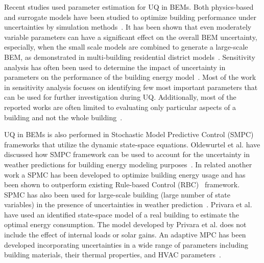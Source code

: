 Recent studies used parameter estimation for UQ in BEMs. Both physics-based and surrogate models have been studied to optimize building performance under uncertainties by simulation methods~\citep{nguyen2014review}. It has been shown that even moderately variable parameters can have a significant effect on the overall BEM uncertainty, especially, when the small scale models are combined to generate a large-scale BEM, as demonstrated in multi-building residential district models~\citep{kavgic2015application,baetens2016modelling}.  Sensitivity analysis has often been used to determine the impact of uncertainty in parameters on the performance of the building energy model~\citep{rodriguez2013uncertainties,tian2013review}. Most of the work in sensitivity analysis focuses on identifying few most important parameters that can be used for further investigation during UQ. Additionally, most of the reported works are often limited to evaluating only particular aspects of a building and not the whole building~\citep{baetens2016modelling}. %


UQ in BEMs is also performed in Stochastic Model Predictive Control (SMPC) frameworks that utilize the dynamic state-space equations. Oldewurtel et al. have discussed how SMPC framework can be used to account for the uncertainty in weather predictions for building energy modeling purposes~\citep{oldewurtel2012use}. In related another work a SPMC has been developed to optimize building energy usage and has been shown to outperform existing Rule-based Control (RBC)~\citep{oldewurtel2010energy} framework. SPMC has also been used for large-scale building (large number of state variables) in the presence of uncertainties in weather prediction~\citep{oldewurtel2014stochastic}. Privara et al.~\citep{privara2011model} have used an identified state-space model of a real building to estimate the optimal energy consumption. The model developed by Privara et al. does not include the effect of internal loads or solar gains. An adaptive MPC has been developed incorporating uncertainties in a wide range of parameters including building materials, their thermal properties, and HVAC parameters~\citep{kim2013building}.


